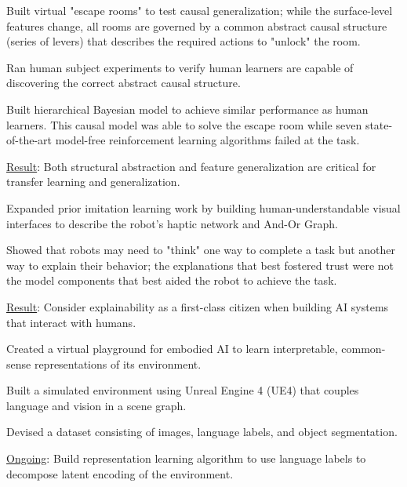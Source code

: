 \begin{cventries}
{\begin{justify}
\end{justify}
\vspace{-1mm}
\begin{cvitems}
  \item Built virtual "escape rooms" to test causal generalization; while the surface-­level features change, all rooms are governed by a common abstract causal structure (series of levers) that describes the required actions to "unlock" the room.
  \item Ran human subject experiments to verify human learners are capable of discovering the correct abstract causal structure.
  \item Built hierarchical Bayesian model to achieve similar performance as human learners.  This causal model was able to solve the escape room while seven state-of-the-art model-free reinforcement learning algorithms failed at the task.
  \item \underline{Result}: Both structural abstraction and feature generalization are critical for transfer learning and generalization.
\end{cvitems}
%
\begin{justify}
\end{justify}
\vspace{-1mm}
\begin{cvitems}
  \item Expanded prior imitation learning work by building human-understandable visual interfaces to describe the robot's haptic network and And-Or Graph.
  \item Showed that robots may need to "think" one way to complete a task but another way to explain their behavior; the explanations that best fostered trust were not the model components that best aided the robot to achieve the task.
  \item \underline{Result}: Consider explainability as a first-class citizen when building AI systems that interact with humans.
\end{cvitems}
%
\begin{justify}
\end{justify}
\vspace{-1mm}
\begin{cvitems}
  \item Created a virtual playground for embodied AI to learn interpretable, common-sense representations of its environment.
  \item Built a simulated environment using Unreal Engine 4 (UE4) that couples language and vision in a scene graph.
  \item Devised a dataset consisting of images, language labels, and object segmentation.
  \item \underline{Ongoing}: Build representation learning algorithm to use language labels to decompose latent encoding of the environment.
\end{cvitems}
}


\end{cventries}
